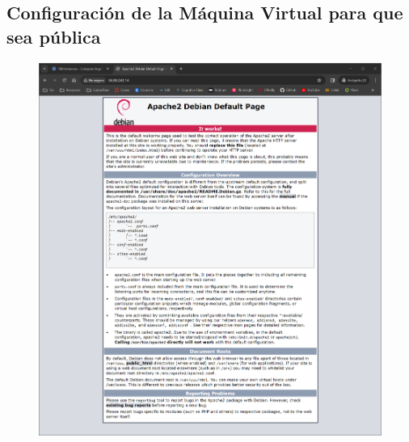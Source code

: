 \documentclass[12pt,a4paper]{article}
\begin{document}
\subsection{Configuración de la Máquina Virtual para que sea pública}

\begin{figure}[H]
    \centering
    \includegraphics[width=1\linewidth]{M4_Servicios_Cómputo_en_la_Nube/Tarea_5_Creación_Máquinas_Virtuales_en_Nube/reporte/figuras/2_3_1_Configuración_Pública.png}
    \label{fig:Google_4}
\end{figure}
\end{document}
